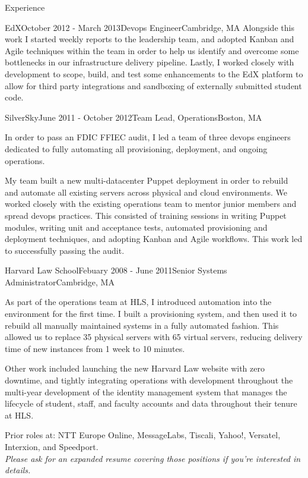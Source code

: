 \documentclass{resume} %
\begin{document}
\begin{rSection}{Experience}
\begin{rSubsection}{EdX}{October 2012 - March 2013}{Devops Engineer}{Cambridge, MA}
Alongside this work I started weekly reports to the leadership team, and adopted  Kanban and Agile techniques within the team in order to help us identify and overcome some bottlenecks in our infrastructure delivery pipeline.  Lastly, I worked closely with development to scope, build, and test some enhancements to the EdX platform to allow for third party integrations and sandboxing of externally submitted student code.
\end{rSubsection}

\begin{rSubsection}{SilverSky}{June 2011 - October 2012}{Team Lead, Operations}{Boston, MA}
\item[] In order to pass an FDIC FFIEC audit, I led a team of three devops engineers dedicated to fully automating all provisioning, deployment, and ongoing operations.

My team built a new multi-datacenter Puppet deployment in order to rebuild and automate all existing servers across physical and cloud environments.  We worked closely with the existing operations team to mentor junior members and spread devops practices.  This consisted of training sessions in writing Puppet modules, writing unit and acceptance tests, automated provisioning and deployment techniques, and adopting Kanban and Agile workflows.  This work led to successfully passing the audit.
\end{rSubsection}

\begin{rSubsection}{Harvard Law School}{Febuary 2008 - June 2011}{Senior Systems Administrator}{Cambridge, MA}
\item[] As part of the operations team at HLS, I introduced automation into the environment for the first time.  I built a provisioning system, and then used it to rebuild all manually maintained systems in a fully automated fashion.  This allowed us to replace 35 physical servers with 65 virtual servers, reducing delivery time of new instances from 1 week to 10 minutes.

Other work included launching the new Harvard Law website with zero downtime, and tightly integrating operations with development throughout the multi-year development of the identity management system that manages the lifecycle of student, staff, and faculty accounts and data throughout their tenure at HLS.
\end{rSubsection}

\begin{center}
Prior roles at: NTT Europe Online, MessageLabs, Tiscali, Yahoo!, Versatel, Interxion, and Speedport.\\
\textit{Please ask for an expanded resume covering those positions if you're interested in details.}
\end{center}

\end{rSection}
\end{document}

